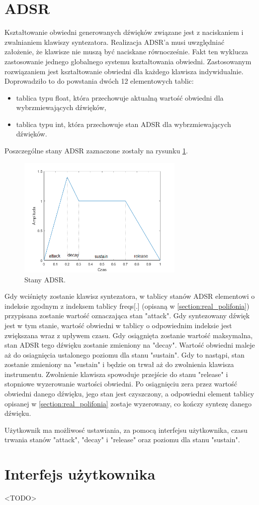 \section{ADSR}
Kształtowanie obwiedni generowanych dźwięków związane jest z naciskaniem i zwalnianiem klawiszy syntezatora. Realizacja ADSR'a musi uwzględniać założenie, że klawisze nie muszą być naciskane równocześnie. Fakt ten wyklucza zastosowanie jednego globalnego systemu kształtowania obwiedni. Zastosowanym rozwiązaniem jest kształtowanie obwiedni dla każdego klawisza indywidualnie. Doprowadziło to do powstania dwóch 12 elementowych tablic:
\begin{itemize}
	\item tablica typu float, która przechowuje aktualną wartość obwiedni dla wybrzmiewających dźwięków,
	\item tablica typu int, która przechowuje stan ADSR dla wybrzmiewających dźwięków.
\end{itemize}
Poszczególne stany ADSR zaznaczone zostały na rysunku \ref{rys:real_adsr}.
\begin{figure}[H]
	\centering
	\includegraphics[width=8cm]{./grafiki/real_adsr}
	\captionsetup{justification=centering}
	\caption{Stany ADSR.}
	\label{rys:real_adsr}
\end{figure}
Gdy wciśnięty zostanie klawisz syntezatora, w tablicy stanów ADSR elementowi o indeksie zgodnym z indeksem tablicy freqs[.] (opisaną w \ref{section:real_polifonia}) przypisana zostanie wartość oznaczająca stan "attack". Gdy syntezowany dźwięk jest w tym stanie, wartość obwiedni w tablicy o odpowiednim indeksie jest zwiększana wraz z upływem czasu. Gdy osiągnięta zostanie wartość maksymalna, stan ADSR tego dźwięku zostanie zmieniony na "decay". Wartość obwiedni maleje aż do osiagnięcia ustalonego poziomu dla stanu "sustain". Gdy to nastąpi, stan zostanie zmieniony na "sustain" i będzie on trwał aż do zwolnienia klawisza instrumentu. Zwolnienie klawisza spowoduje przejście do stanu "release" i stopniowe wyzerowanie wartości obwiedni. Po osiągnięciu zera przez wartość obwiedni danego dźwięku, jego stan jest czyszczony, a odpowiedni element tablicy opisanej w \ref{section:real_polifonia} zostaje wyzerowany, co kończy syntezę danego dźwięku.

Użytkownik ma możliwosć ustawiania, za pomocą interfejsu użytkownika, czasu trwania stanów "attack", "decay" i "release" oraz poziomu dla stanu "sustain".

\section{Interfejs użytkownika}
<TODO>